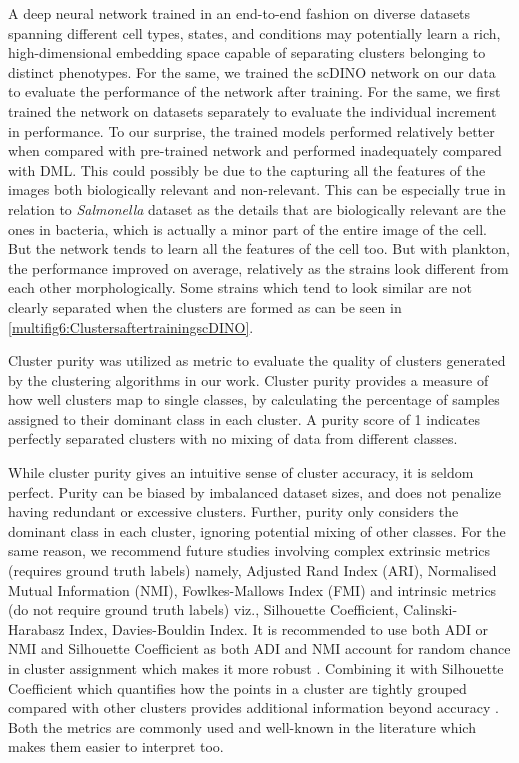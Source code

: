 \documentclass[12pt,a4paper]{article}
\begin{document}
A deep neural network trained in an end-to-end fashion on diverse datasets spanning different cell types, states, and conditions may potentially learn a rich, high-dimensional embedding space capable of separating clusters belonging to distinct phenotypes. For the same, we trained the scDINO network on our data to evaluate the performance of the network after training. For the same, we first trained the network on datasets separately to evaluate the individual increment in performance. To our surprise, the trained models performed relatively better when compared with pre-trained network and performed inadequately compared with DML. This could possibly be due to the capturing all the features of the images both biologically relevant and non-relevant. This can be especially true in relation to \textit{Salmonella} dataset as the details that are biologically relevant are the ones in bacteria, which is actually a minor part of the entire image of the cell. But the network tends to learn all the features of the cell too. But with plankton, the performance improved on average, relatively as the strains look different from each other morphologically. Some strains which tend to look similar are not clearly separated when the clusters are formed as can be seen in \ref{multifig6:ClustersaftertrainingscDINO}.

Cluster purity was utilized as metric to evaluate the quality of clusters generated by the clustering algorithms in our work. Cluster purity provides a measure of how well clusters map to single classes, by calculating the percentage of samples assigned to their dominant class in each cluster. A purity score of 1 indicates perfectly separated clusters with no mixing of data from different classes.

While cluster purity gives an intuitive sense of cluster accuracy, it is seldom perfect. Purity can be biased by imbalanced dataset sizes, and does not penalize having redundant or excessive clusters. Further, purity only considers the dominant class in each cluster, ignoring potential mixing of other classes. For the same reason, we recommend future studies involving complex extrinsic metrics (requires ground truth labels) namely, Adjusted Rand Index (ARI), Normalised Mutual Information (NMI), Fowlkes-Mallows Index (FMI) and intrinsic metrics (do not require ground truth labels) viz., Silhouette Coefficient, Calinski-Harabasz Index, Davies-Bouldin Index. It is recommended to use both ADI or NMI and Silhouette Coefficient as both ADI and NMI account for random chance in cluster assignment which makes it more robust \cite{ARI, NMI}. Combining it with Silhouette Coefficient which quantifies how the points in a cluster are tightly grouped compared with other clusters provides additional information beyond accuracy \cite{silhouettecoefficient}. Both the metrics are commonly used and well-known in the literature which makes them easier to interpret too.
\end{document}
